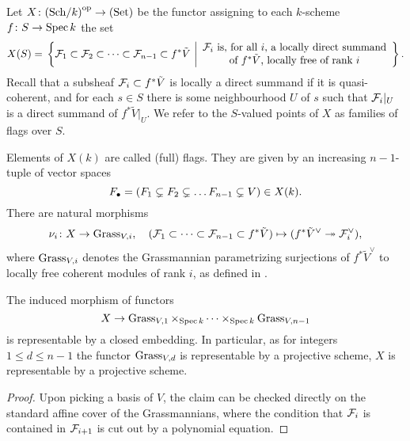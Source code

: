 \documentclass[../main.tex]{subfiles}
\begin{document}
\begin{defi}\label{def:FlagVariety}
  Let $X\colon  {(\mathrm{Sch}/{k})}^{\mathrm{op}} \to {(\mathrm{Set})}$ be the functor assigning to each $k$-scheme 
  $f\colon S \to \operatorname{Spec} k$
  the set 
  \begin{equation*}
    X(S) = \\ \left\{\cF_1 \subset \cF_2 \subset \dots \subset \cF_{n-1} \subset
      f^* \tilde V \ \bigg \vert  \begin{array}c
      \text{$\cF_i$ is, for all $i$, a locally direct summand} \\
      \text{of $f^*\tilde V$, locally free of rank $i$}
  \end{array} \right\}.
  \end{equation*}
  Recall that a subsheaf $\mathcal{F}_i \subset f^* \tilde V$ is
  locally a direct summand
  if it is quasi-coherent, and for each $s \in S$ there is some neighbourhood 
  $U$ of $s$ such that $\mathcal{F}_i|_U$ is a direct summand of $f^* \tilde V|_U$. 
  We refer to the $S$-valued points of $X$ as families of flags over $S$.
\end{defi}
Elements of $X(k)$ are called (full) flags. They are given by an increasing
$n-1$-tuple of vector spaces 
$$F_\bullet = (F_1 \subsetneq F_2 \subsetneq \dots F_{n-1} \subsetneq V) \in X(k).$$
  There are natural morphisms
  \begin{equation*}
    \nu_i\colon X \to \operatorname{Grass}_{V,i}, \quad (\mathcal{F}_1 \subset \dots \subset \mathcal{F}_{n-1}
    \subset f^* \tilde V) \mapsto (f^* \tilde V^\vee \twoheadrightarrow \mathcal{F}_i^\vee),
  \end{equation*}
  where $\operatorname{Grass}_{V,i}$ denotes the Grassmannian parametrizing surjections of
  $f^*\tilde V^\vee$ to locally free coherent modules of rank $i$, as defined
  in \cite[Section 8]{gortz2020algebraic}.

\begin{prop}\label{prop:FlagVarisProjective}
  The induced morphism of functors
  \begin{equation*}
    X \to \operatorname{Grass}_{V,1} \times_{\operatorname{Spec} k} \dots \times_{\operatorname{Spec} k}
    \operatorname{Grass}_{V,n-1}
  \end{equation*}
  is representable by a closed embedding. In particular, as for integers $1 \leq d \leq n-1$
  the functor $\operatorname{Grass}_{V,d}$ is representable by a projective scheme, 
  $X$ is representable by a projective scheme. 
\begin{proof}
  Upon picking a basis of $V$, the claim can be checked directly on the
  standard affine cover of the Grassmannians, where the condition that $\mathcal{F}_i$ is
  contained in $\mathcal{F}_{i+1}$ is cut out by a polynomial equation.
\end{proof}
\end{prop}
\end{document}
